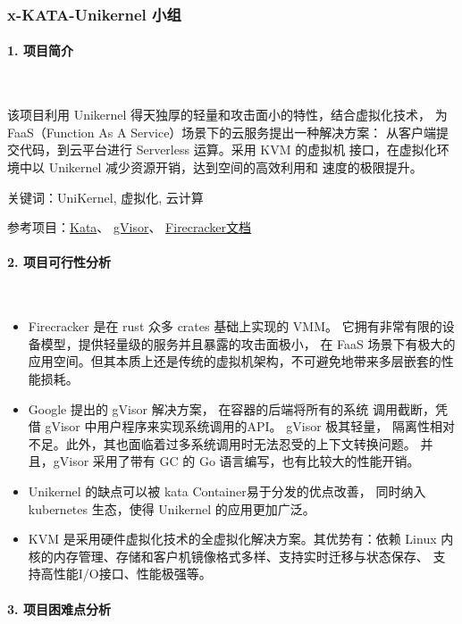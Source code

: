 \documentclass[UTF8,fontset=none,linespread=1.15]{ctexart}
\begin{document}
\subsubsection{x-KATA-Unikernel 小组}

\paragraph{1. 项目简介}~\par

该项目利用 Unikernel 得天独厚的轻量和攻击面小的特性，结合虚拟化技术，
为FaaS（Function As A Service）场景下的云服务提出一种解决方案：
从客户端提交代码，到云平台进行 Serverless 运算。采用 KVM 的虚拟机
接口，在虚拟化环境中以 Unikernel 减少资源开销，达到空间的高效利用和
速度的极限提升。

关键词：UniKernel, 虚拟化, 云计算

参考项目：\href{https://github.com/kata-containers/kata-containers}{Kata}、
\href{https://github.com/google/gvisor/blob/master/README.md}{gVisor}、
\href{https://firecracker-microvm.github.io/}{Firecracker文档}

\paragraph{2. 项目可行性分析}~\par

\begin{itemize}
\item Firecracker 是在 rust 众多 crates 基础上实现的 VMM。
它拥有非常有限的设备模型，提供轻量级的服务并且暴露的攻击面极小，
在 FaaS 场景下有极大的应用空间。但其本质上还是传统的虚拟机架构，不可避免地带来多层嵌套的性能损耗。
\item  Google 提出的 gVisor 解决方案， 在容器的后端将所有的系统
调用截断，凭借 gVisor 中用户程序来实现系统调用的API。 gVisor 极其轻量，
隔离性相对不足。此外，其也面临着过多系统调用时无法忍受的上下文转换问题。
并且，gVisor 采用了带有 GC 的 Go 语言编写，也有比较大的性能开销。
\item Unikernel 的缺点可以被 kata Container易于分发的优点改善，
同时纳入 kubernetes 生态，使得 Unikernel 的应用更加广泛。
\item KVM 是采用硬件虚拟化技术的全虚拟化解决方案。其优势有：依赖
Linux 内核的内存管理、存储和客户机镜像格式多样、支持实时迁移与状态保存、
支持高性能I/O接口、性能极强等。
\end{itemize}

\paragraph{3. 项目困难点分析}~\par
\end{document}
